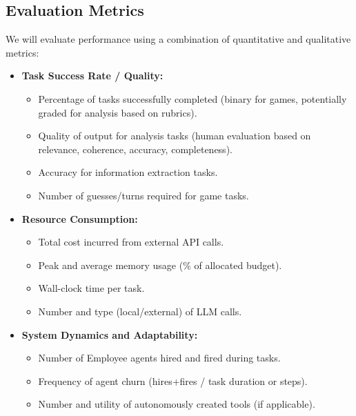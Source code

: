 \documentclass[conference]{IEEEtran}
\begin{document}
\subsection{Evaluation Metrics}
\label{subsec:metrics}
We will evaluate performance using a combination of quantitative and qualitative metrics:
\begin{itemize}
    \item \textbf{Task Success Rate / Quality:}
        \begin{itemize}
            \item Percentage of tasks successfully completed (binary for games, potentially graded for analysis based on rubrics).
            \item Quality of output for analysis tasks (human evaluation based on relevance, coherence, accuracy, completeness).
            \item Accuracy for information extraction tasks.
            \item Number of guesses/turns required for game tasks.
        \end{itemize}
    \item \textbf{Resource Consumption:}
        \begin{itemize}
            \item Total cost incurred from external API calls.
            \item Peak and average memory usage (\% of allocated budget).
            \item Wall-clock time per task.
            \item Number and type (local/external) of LLM calls.
        \end{itemize}
    \item \textbf{System Dynamics and Adaptability:}
        \begin{itemize}
            \item Number of Employee agents hired and fired during tasks.
            \item Frequency of agent churn (hires+fires / task duration or steps).
            \item Number and utility of autonomously created tools (if applicable).
        \end{itemize}
\end{itemize}





\end{document}
